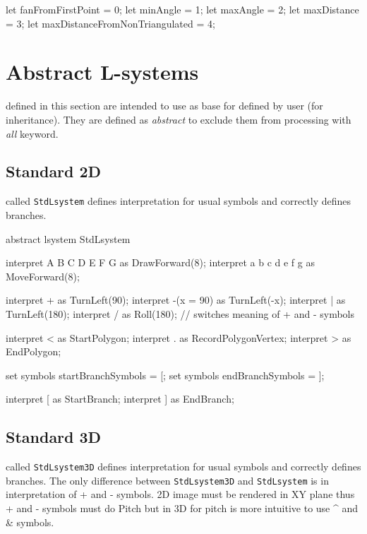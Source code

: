 \begin{LsystemBreak}
let fanFromFirstPoint = 0;
let minAngle = 1;
let maxAngle = 2;
let maxDistance = 3;
let maxDistanceFromNonTriangulated = 4;
\end{LsystemBreak}


\section{Abstract L-systems}

\lsystems defined in this section are intended to use as base \lsystems for \lsystems defined by user (for inheritance).
They are defined as \emph{abstract} to exclude them from processing with \emph{all} keyword.


\subsection{Standard \lsystem 2D}

\lsystem called \texttt{StdLsystem} defines interpretation for usual symbols and correctly defines branches.

\begin{LsystemBreak}
abstract lsystem StdLsystem {
	interpret A B C D E F G as DrawForward(8);
	interpret a b c d e f g as MoveForward(8);

	interpret + as TurnLeft(90);
	interpret -(x = 90) as TurnLeft(-x);
	interpret | as TurnLeft(180);
	interpret / as Roll(180); // switches meaning of + and - symbols

	interpret < as StartPolygon;
	interpret . as RecordPolygonVertex;
	interpret > as EndPolygon;

	set symbols startBranchSymbols = [;
	set symbols endBranchSymbols = ];

	interpret [ as StartBranch;
	interpret ] as EndBranch;
}
\end{LsystemBreak}


\subsection{Standard \lsystem 3D}

\lsystem called \texttt{StdLsystem3D} defines interpretation for usual symbols and correctly defines branches.
The only difference between \texttt{StdLsystem3D} and \texttt{StdLsystem} is in interpretation of + and - symbols.
2D image must be rendered in XY plane thus + and - symbols must do Pitch but in 3D for pitch is more intuitive to use \^{} and \& symbols.

